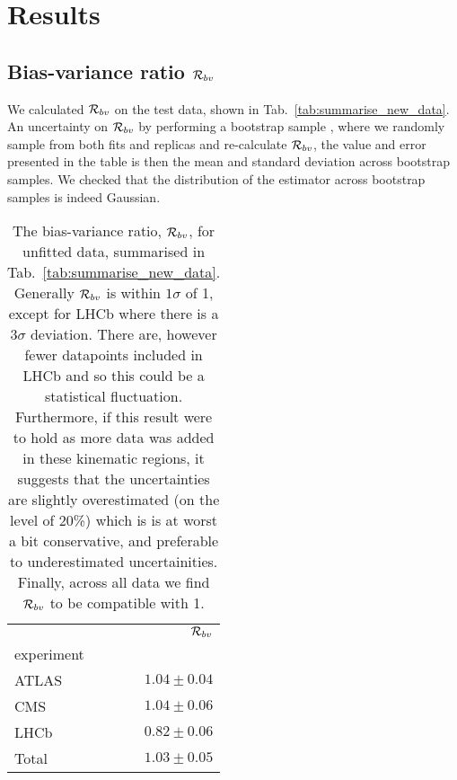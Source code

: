 \section{Results}

\subsection{Bias-variance ratio $\mathcal{R}_{bv}$}

We calculated $\mathcal{R}_{bv}$ on the test data, shown in
Tab.~\ref{tab:summarise_new_data}. An
uncertainty on $\mathcal{R}_{bv}$ by performing a bootstrap sample
\cite{efron1994introduction},
where we randomly sample from both fits and replicas and re-calculate
$\mathcal{R}_{bv}$, the value and error presented in the table is then the mean
and standard deviation across bootstrap samples. We checked that the distribution
of the estimator across bootstrap samples is indeed Gaussian.

\begin{table}
    \begin{center}
        \begin{tabular}{lr}
            \toprule
            {} &  $\mathcal{R}_{bv}$ \\
            experiment &                      \\
            \midrule
            ATLAS       &                 $1.04 \pm 0.04$  \\
            CMS         &                 $1.04 \pm 0.06$ \\
            LHCb       &                 $0.82 \pm 0.06$ \\
            Total       &                 $ 1.03 \pm 0.05$ \\
            \bottomrule
        \end{tabular}
    \end{center}
    \caption{
        The bias-variance ratio, $\mathcal{R}_{bv}$, for unfitted data, summarised in
        Tab.~\ref{tab:summarise_new_data}. Generally $\mathcal{R}_{bv}$ is within
        $1\sigma$ of 1, except for LHCb where there is a $3\sigma$ deviation.
        There are, however fewer datapoints included in LHCb and so this could be
        a statistical fluctuation. Furthermore, if this result were to hold as
        more data was added in these kinematic regions, it suggests that the
        uncertainties are slightly overestimated (on the level of 20\%) which is
        is at worst a bit conservative, and preferable to underestimated
        uncertainities. Finally, across all data we find $\mathcal{R}_{bv}$ to
        be compatible with 1.
    }
    \label{tab:biasvarratio}
\end{table}

